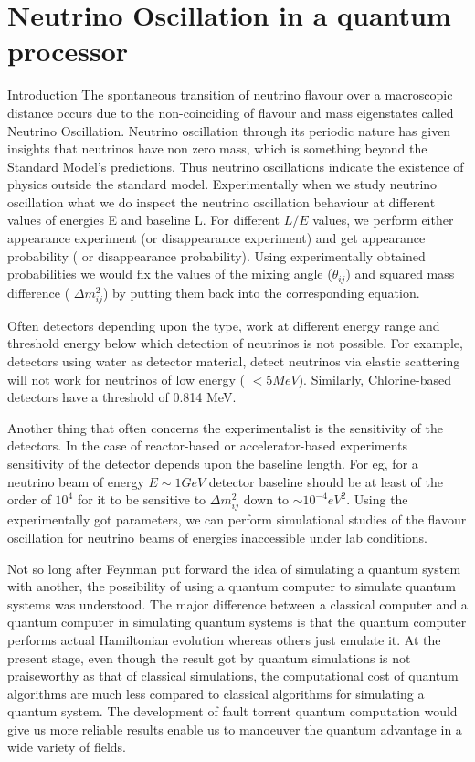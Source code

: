 \documentclass[12pt,a4paper]{report}
\begin{document}
\chapter{Neutrino Oscillation in a quantum processor}\label{sec4}
Introduction
The spontaneous transition of neutrino flavour over a macroscopic distance occurs due to the non-coinciding of flavour and mass eigenstates called Neutrino Oscillation.  Neutrino oscillation through its periodic nature has given insights that neutrinos have non zero mass, which is something beyond the Standard Model’s predictions. Thus neutrino oscillations indicate the existence of physics outside the standard model. Experimentally when we study neutrino oscillation what we do inspect the neutrino oscillation behaviour at different values of energies E and baseline L. For different $L/E$ values, we perform either appearance experiment (or disappearance experiment) and get appearance probability ( or disappearance probability). Using experimentally obtained probabilities we would fix the values of the mixing angle ($\theta_{ij}$) and squared mass difference ( $\Delta m_{ij}^{2}$) by putting them back into the corresponding equation. \par
Often detectors depending upon the type, work at different energy range and threshold energy below which detection of neutrinos is not possible. For example, detectors using water as detector material, detect neutrinos via elastic scattering will not work for neutrinos of low energy ( $< 5 MeV$). Similarly, Chlorine-based detectors have a threshold of 0.814 MeV.\par
Another thing that often concerns the experimentalist is the sensitivity of the detectors. In the case of reactor-based or accelerator-based experiments sensitivity of the detector depends upon the baseline length. For eg, for a neutrino beam of energy $E \sim 1 GeV$ detector baseline should be at least of the order of $10^{4}$  for it to be sensitive to $\Delta m_{ij}^{2}$ down to $\sim 10^{-4} eV^{2}$. Using the experimentally got parameters, we can perform simulational studies of the flavour oscillation for neutrino beams of energies inaccessible under lab conditions.\par
Not so long after Feynman put forward the idea of simulating a quantum system with another, the possibility of using a quantum computer to simulate quantum systems was understood. The major difference between a classical computer and a quantum computer in simulating quantum systems is that the quantum computer performs actual Hamiltonian evolution whereas others just emulate it. At the present stage, even though the result got by quantum simulations is not praiseworthy as that of classical simulations, the computational cost of quantum algorithms are much less compared to classical algorithms for simulating a quantum system. The development of fault torrent quantum computation would give us more reliable results enable us to manoeuver the quantum advantage in a wide variety of fields.\par
\end{document}
